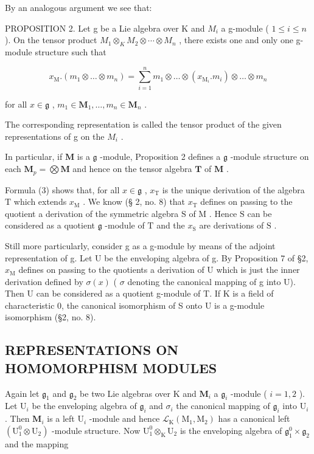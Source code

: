 By an analogous argument we see that:

PROPOSITION 2. Let g be a Lie algebra over K and \(M_{i}\) a g-module ( \(1 \leqslant i \leqslant n\) ). On the tensor product \(M_{1} \otimes_{K} M_{2} \otimes \cdots \otimes M_{n}\) , there exists one and only one g-module structure such that

\[
x _ {\mathrm{M}}. (m _ {1} \otimes \dots \otimes m _ {n}) = \sum_ {i = 1} ^ {n} m _ {1} \otimes \dots \otimes (x _ {\mathrm{M} _ {i}}. m _ {i}) \otimes \dots \otimes m _ {n}\tag{3}
\]

for all \(x \in \mathfrak{g}\) , \(m_1 \in \mathbf{M}_1, \ldots, m_n \in \mathbf{M}_n\) .

The corresponding representation is called the tensor product of the given representations of g on the \(M_{i}\) .

In particular, if \(\mathbf{M}\) is a \(\mathfrak{g}\) -module, Proposition 2 defines a \(\mathfrak{g}\) -module structure
on each \(\mathbf{M}_p = \bigotimes \mathbf{M}\) and hence on the tensor algebra \(\mathbf{T}\) of \(\mathbf{M}\) .

Formula (3) shows that, for all \(x \in \mathfrak{g}\) , \(x_{\mathrm{T}}\) is the unique derivation of the algebra \(\mathrm{T}\) which extends \(x_{\mathrm{M}}\) . We know (§ 2, no. 8) that \(x_{\mathrm{T}}\) defines on passing to the quotient a derivation of the symmetric algebra \(\mathrm{S}\) of \(\mathrm{M}\) . Hence \(\mathrm{S}\) can be considered as a quotient \(\mathfrak{g}\) -module of \(\mathrm{T}\) and the \(x_{\mathrm{S}}\) are derivations of \(\mathrm{S}\) .

Still more particularly, consider g as a g-module by means of the adjoint representation of g. Let U be the enveloping algebra of g. By Proposition 7 of §2, \(x_{\mathrm{M}}\) defines on passing to the quotients a derivation of U which is just the inner derivation defined by \(\sigma(x)\) ( \(\sigma\) denoting the canonical mapping of g into U). Then U can be considered as a quotient g-module of T. If K is a field of characteristic 0, the canonical isomorphism of S onto U is a g-module isomorphism (§2, no. 8).

\subsection{REPRESENTATIONS ON HOMOMORPHISM MODULES}

Again let \(\mathfrak{g}_1\) and \(\mathfrak{g}_2\) be two Lie algebras over K and \(\mathbf{M}_i\) a \(\mathfrak{g}_i\) -module ( \(i = 1, 2\) ). Let \(\mathrm{U}_i\) be the enveloping algebra of \(\mathfrak{g}_i\) and \(\sigma_i\) the canonical mapping of \(\mathfrak{g}_i\) into \(\mathrm{U}_i\) . Then \(\mathbf{M}_i\) is a left \(\mathrm{U}_i\) -module and hence \(\mathcal{L}_{\mathrm{K}}(\mathrm{M}_1, \mathrm{M}_2)\) has a canonical left \((\mathrm{U}_1^0 \otimes \mathrm{U}_2)\) -module structure. Now \(\mathrm{U}_1^0 \otimes_{\mathrm{K}} \mathrm{U}_2\) is the enveloping algebra of \(\mathfrak{g}_1^0 \times \mathfrak{g}_2\) and the mapping

